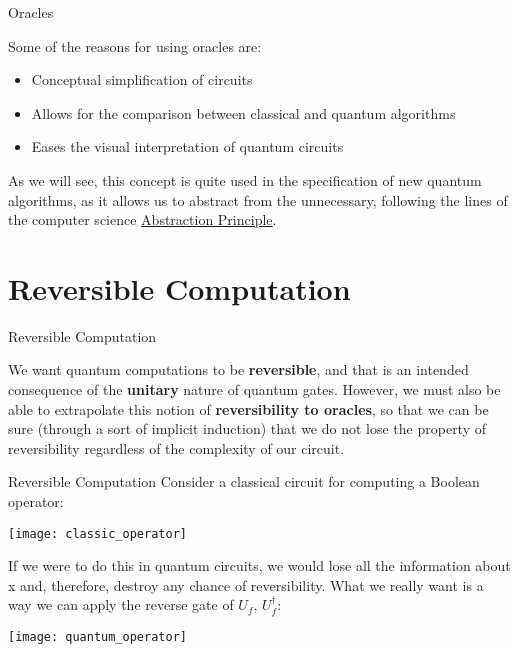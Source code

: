 \documentclass[aspectratio=43]{beamer}
\begin{document}
\begin{frame}{\q Oracles}
\begin{card}
    Some of the reasons for using oracles are:
    \begin{itemize}
        \item Conceptual simplification of circuits
        \item Allows for the comparison between classical and quantum algorithms
        \item Eases the visual interpretation of quantum circuits
    \end{itemize}
\end{card}
\begin{card}
    As we will see, this concept is quite used in the specification of new quantum algorithms, as it allows us to abstract from the unnecessary, following the lines of the computer science  \href{https://en.wikipedia.org/wiki/Abstraction_principle_(computer_programming)}{Abstraction Principle}. 
\end{card}
\pagenumber
\end{frame}

\section{\q Reversible Computation}
\begin{frame}{\q Reversible Computation}
\begin{card}
    We want quantum computations to be \textbf{reversible}, and that is an intended consequence of the \textbf{unitary} nature of quantum gates. However, we must also be able to extrapolate this notion of \textbf{reversibility to oracles}, so that we can be sure (through a sort of implicit induction) that we do not lose the property of reversibility regardless of the complexity of our circuit.
\end{card}
\pagenumber
\end{frame}

\begin{frame}{\q Reversible Computation}
    Consider a classical circuit for computing a Boolean operator:
    \begin{center}
        \texttt{[image: classic\_operator]}
    \end{center}
    \small{If we were to do this in quantum circuits, we would lose all the information about x and, therefore, destroy any chance of reversibility. What we really want is a way we can apply the reverse gate of $U_f$, $U_f^\dag$:}
    \begin{center}
        \texttt{[image: quantum\_operator]}
    \end{center}
\pagenumber
\end{frame}
\end{document}
